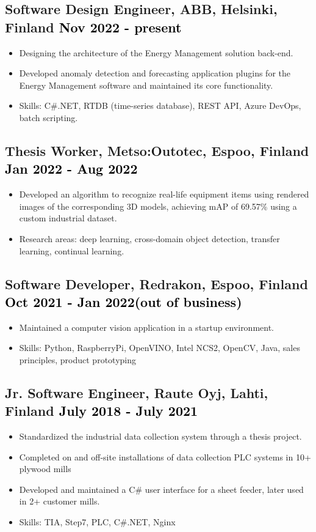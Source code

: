 \documentclass[a4paper,10pt]{article}
\begin{document}
\subsection*{Software Design Engineer, ABB, Helsinki, Finland \hfill \textcolor{black}{Nov 2022 - present}}
\begin{itemize}
    \item Designing the architecture of the Energy Management solution back-end.
    \item Developed anomaly detection and forecasting application plugins for the Energy Management software and maintained its core functionality.
    \item Skills: C\#.NET, RTDB (time-series database), REST API, Azure DevOps, batch scripting.
\end{itemize}

\subsection*{Thesis Worker, Metso:Outotec, Espoo, Finland \hfill \textcolor{black}{Jan 2022 - Aug 2022}}
\begin{itemize}
    \item Developed an algorithm to recognize real-life equipment items using rendered images of the corresponding 3D models, achieving mAP of 69.57\% using a custom industrial dataset.
    \item Research areas: deep learning, cross-domain object detection, transfer learning, continual learning.
\end{itemize}

\subsection*{Software Developer, Redrakon, Espoo, Finland \hfill \textcolor{black}{Oct 2021 - Jan 2022(out of business)}}
\begin{itemize}
    \item Maintained a computer vision application in a startup environment.
    \item Skills: Python, RaspberryPi, OpenVINO, Intel NCS2, OpenCV, Java, sales principles, product prototyping 
\end{itemize}

\subsection*{Jr. Software Engineer, Raute Oyj, Lahti, Finland \hfill \textcolor{black}{July 2018 - July 2021}}
\begin{itemize}
    \item Standardized the industrial data collection system through a thesis project.
    \item Completed on and off-site installations of data collection PLC systems in 10+ plywood mills 
    \item Developed and maintained a C\# user interface for a sheet feeder, later used in 2+ customer mills.
    \item Skills: TIA, Step7, PLC, C\#.NET, Nginx
\end{itemize}
\end{document}
